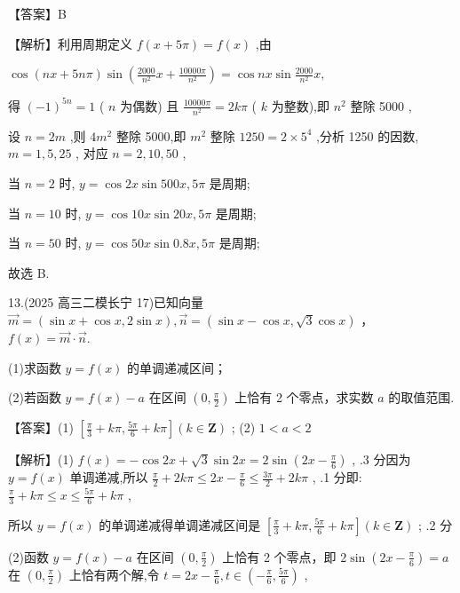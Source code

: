 \documentclass[10pt]{article}
\begin{document}
【答案】B

【解析】利用周期定义 \(f\left( {x + {5\pi }}\right)  = f\left( x\right)\) ,由

\(\cos \left( {{nx} + {5n\pi }}\right) \sin \left( {\frac{2000}{{n}^{2}}x + \frac{10000\pi }{{n}^{2}}}\right)  = \cos {nx}\sin \frac{2000}{{n}^{2}}x,\)

得 \({\left( -1\right) }^{5n} = 1\) ( \(n\) 为偶数) 且 \(\frac{10000\pi }{{n}^{2}} = {2k\pi }\) ( \(k\) 为整数),即 \({n}^{2}\) 整除 5000 ,

设 \(n = {2m}\) ,则 \(4{m}^{2}\) 整除 5000,即 \({m}^{2}\) 整除 \({1250} = 2 \times  {5}^{4}\) ,分析 1250 的因数, \(m = 1,5,{25}\) , 对应 \(n = 2,{10},{50}\) ,

当 \(n = 2\) 时, \(y = \cos {2x}\sin {500x},{5\pi }\) 是周期;

当 \(n = {10}\) 时, \(y = \cos {10x}\sin {20x},{5\pi }\) 是周期;

当 \(n = {50}\) 时, \(y = \cos {50x}\sin {0.8x},{5\pi }\) 是周期;

故选 B.

13.(2025 高三二模长宁 17)已知向量 \(\overrightarrow{m} = \left( {\sin x + \cos x,2\sin x}\right) ,\overrightarrow{n} = \left( {\sin x - \cos x,\sqrt{3}\cos x}\right)\) ， \(f\left( x\right)  = \overrightarrow{m} \cdot  \overrightarrow{n}.\)

(1)求函数 \(y = f\left( x\right)\) 的单调递减区间；

(2)若函数 \(y = f\left( x\right)  - a\) 在区间 \(\left( {0,\frac{\pi }{2}}\right)\) 上恰有 2 个零点，求实数 \(a\) 的取值范围.

【答案】(1) \(\left\lbrack  {\frac{\pi }{3} + {k\pi },\frac{5\pi }{6} + {k\pi }}\right\rbrack  \left( {k \in  \mathbf{Z}}\right)\) ; (2) \(1 < a < 2\)

【解析】(1) \(f\left( x\right)  =  - \cos {2x} + \sqrt{3}\sin {2x} = 2\sin \left( {{2x} - \frac{\pi }{6}}\right)\) , .3 分因为 \(y = f\left( x\right)\) 单调递减,所以 \(\frac{\pi }{2} + {2k\pi } \leq  {2x} - \frac{\pi }{6} \leq  \frac{3\pi }{2} + {2k\pi }\) , .1 分即: \(\frac{\pi }{3} + {k\pi } \leq  x \leq  \frac{5\pi }{6} + {k\pi }\) ,

所以 \(y = f\left( x\right)\) 的单调递减得单调递减区间是 \(\left\lbrack  {\frac{\pi }{3} + {k\pi },\frac{5\pi }{6} + {k\pi }}\right\rbrack  \left( {k \in  \mathbf{Z}}\right)\) ; .2 分

(2)函数 \(y = f\left( x\right)  - a\) 在区间 \(\left( {0,\frac{\pi }{2}}\right)\) 上恰有 2 个零点，即 \(2\sin \left( {{2x} - \frac{\pi }{6}}\right)  = a\) 在 \(\left( {0,\frac{\pi }{2}}\right)\) 上恰有两个解,令 \(t = {2x} - \frac{\pi }{6},t \in  \left( {-\frac{\pi }{6},\frac{5\pi }{6}}\right)\) ,
\end{document}
